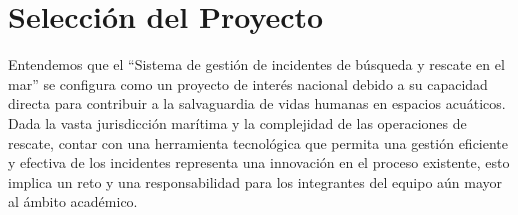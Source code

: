 \section{Selección del Proyecto}\label{sec:seleccionDelProyecto}

Entendemos que el “Sistema de gestión de incidentes de búsqueda y rescate en el mar” se configura como un proyecto de interés nacional debido a su capacidad directa para contribuir a la salvaguardia de vidas humanas en espacios acuáticos. Dada la vasta jurisdicción marítima y la complejidad de las operaciones de rescate, contar con una herramienta tecnológica que permita una gestión eficiente y efectiva de los incidentes representa una innovación en el proceso existente, esto implica un reto y una responsabilidad para los integrantes del equipo aún mayor al ámbito académico. 
